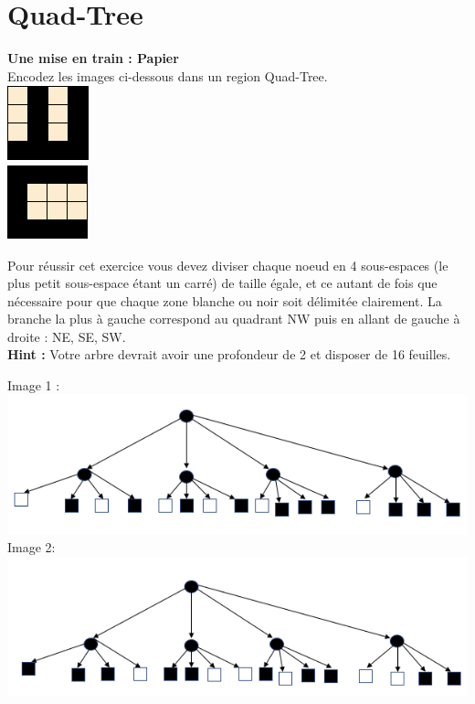 \newpage

\section{ Quad-Tree}
\begin{Exercice}[10 minutes]\textbf{Une mise en train : Papier}\\

Encodez les images ci-dessous dans un region Quad-Tree.\\

\includegraphics[]{Quad-Tree 1.PNG}\\
\includegraphics[]{Quad-Tree 2.PNG}

\begin{conseil}
   Pour réussir cet exercice vous devez diviser chaque noeud en 4 sous-espaces (le plus petit sous-espace étant un carré) de taille égale, et ce autant de fois que nécessaire pour que chaque zone blanche ou noir soit délimitée clairement. La branche la plus à gauche correspond au quadrant NW puis en allant de gauche à droite : NE, SE, SW. \\
    
    \textbf{Hint :} Votre arbre devrait avoir une profondeur de 2 et disposer de 16 feuilles.
\end{conseil}
\begin{solution}
Image 1 :\\
    \includegraphics[]{Quad-Tree 1 solution.PNG}\\
    
Image 2: \\
    \includegraphics[]{Quad-Tree 2 solution.PNG}
\end{solution}
\end{Exercice}
